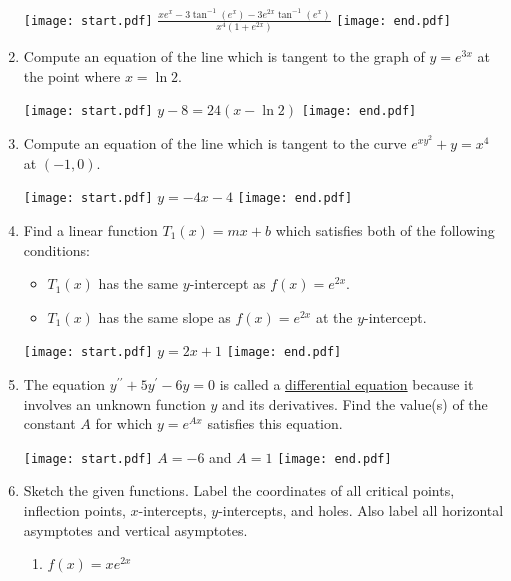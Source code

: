 \documentclass[12pt]{article}
\begin{document}
\begin{enumerate}
\texttt{[image: start.pdf]}
{{$\frac{xe^{x}-3\tan^{-1}{(e^x)}-3e^{2x}\tan^{-1}{(e^x)}}{x^4(1+e^{2x})}$}}
\texttt{[image: end.pdf]}


\item Compute an equation of the line which is tangent to the graph of $y=e^{3x}$ at the point where $x=\ln2$.

\texttt{[image: start.pdf]}
{{$y-8=24(x-\ln{2})$}}
\texttt{[image: end.pdf]}


\item Compute an equation of the line which is tangent to the curve $e^{xy^2}+y=x^4$ at $(-1,0)$.

\texttt{[image: start.pdf]}
{{$y=-4x-4$}}
\texttt{[image: end.pdf]}



\item Find a linear function $T_1(x)=mx+b$ which satisfies both of the following conditions:

\begin{itemize}

\item $T_1(x)$ has the same $y$-intercept as $f(x)=e^{2x}$.

\item $T_1(x)$ has the same slope as $f(x)=e^{2x}$ at the $y$-intercept.

\end{itemize}

\texttt{[image: start.pdf]}
{{$y=2x+1$}}
\texttt{[image: end.pdf]}


\item The equation $y^{\prime \prime}+5y^{\prime}-6y=0$ is called a \underline{differential equation} because it involves an unknown function $y$ and its derivatives.  Find the value(s) of the constant $A$ for which $y=e^{Ax}$ satisfies this equation. 

\texttt{[image: start.pdf]}
{{$A=-6$ and $A=1$}}
\texttt{[image: end.pdf]}


\item Sketch the given functions.  Label  the coordinates of all critical points, inflection points, $x$-intercepts, $y$-intercepts, and holes.  Also label all horizontal asymptotes and vertical asymptotes.

\begin{enumerate}

\item $f(x)=xe^{2x}$


\end{enumerate}
\end{enumerate}
\end{document}
